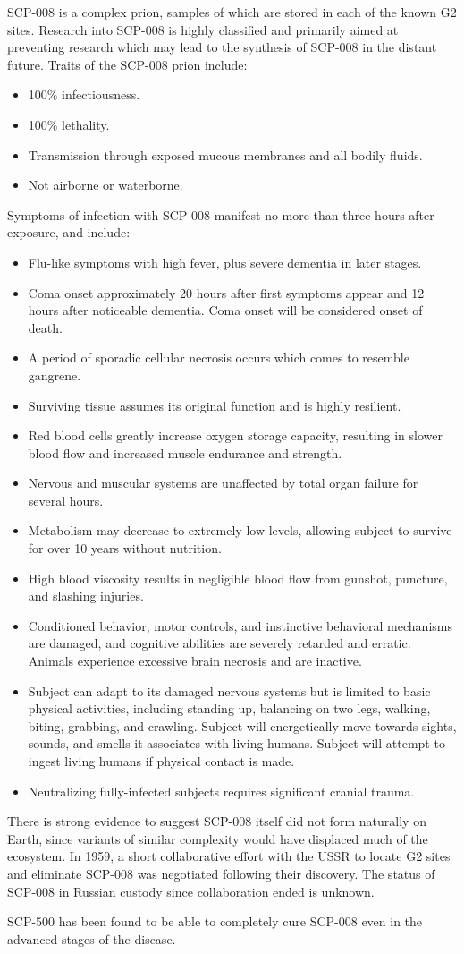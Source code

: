  SCP-008 is a complex prion, samples of which are stored in each of the known G2 sites. Research into SCP-008 is highly classified and primarily aimed at preventing research which may lead to the synthesis of SCP-008 in the distant future. Traits of the SCP-008 prion include:
\begin{itemize}
\renewcommand{\labelitemi}{$\ast$}
\item 100\% infectiousness.
\item 100\% lethality.\newpage
\item Transmission through exposed mucous membranes and all bodily fluids.
\item Not airborne or waterborne.
\end{itemize}
Symptoms of infection with SCP-008 manifest no more than three hours after exposure, and include:
\begin{itemize}
\renewcommand{\labelitemi}{$\ast$}
\item Flu-like symptoms with high fever, plus severe dementia in later stages.
\item Coma onset approximately 20 hours after first symptoms appear and 12 hours after noticeable dementia. Coma onset will be considered onset of death.
\item A period of sporadic cellular necrosis occurs which comes to resemble gangrene. \item Surviving tissue assumes its original function and is highly resilient.
\item Red blood cells greatly increase oxygen storage capacity, resulting in slower blood flow and increased muscle endurance and strength.
\item Nervous and muscular systems are unaffected by total organ failure for several hours.
\item Metabolism may decrease to extremely low levels, allowing subject to survive for over 10 years without nutrition.
\item High blood viscosity results in negligible blood flow from gunshot, puncture, and slashing injuries.
\item Conditioned behavior, motor controls, and instinctive behavioral mechanisms are damaged, and cognitive abilities are severely retarded and erratic. Animals experience excessive brain necrosis and are inactive.
\item Subject can adapt to its damaged nervous systems but is limited to basic physical activities, including standing up, balancing on two legs, walking, biting, grabbing, and crawling. Subject will energetically move towards sights, sounds, and smells it associates with living humans. Subject will attempt to ingest living humans if physical contact is made.
\item Neutralizing fully-infected subjects requires significant cranial trauma.
\end{itemize}
There is strong evidence to suggest SCP-008 itself did not form naturally on Earth, since variants of similar complexity would have displaced much of the ecosystem. In 1959, a short collaborative effort with the USSR to locate G2 sites and eliminate SCP-008 was negotiated following their discovery. The status of SCP-008 in Russian custody since collaboration ended is unknown.

 SCP-500 has been found to be able to completely cure SCP-008 even in the advanced stages of the disease.
